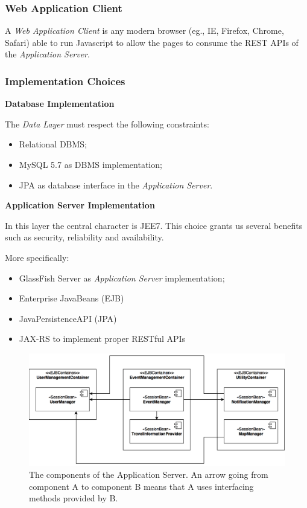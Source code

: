 \documentclass{article}
\begin{document}
	\subsubsection{Web Application Client}
	A \textit{Web Application Client} is any modern browser (eg., IE, Firefox, Chrome, Safari) able to run Javascript to allow the pages to consume the REST APIs of the \textit{Application Server}.


	\subsubsection{Implementation Choices}

	\textbf{Database Implementation}

	\medskip
	\noindent
	The \textit{Data Layer} must respect the following constraints: 
	\begin{itemize}
	\item Relational DBMS;
	\item MySQL 5.7 as DBMS implementation;
	\item JPA as database interface in the \textit{Application Server}.
	\end{itemize}

	\bigskip
	\noindent
	\textbf{Application Server Implementation}

	\medskip
	\noindent
	In this layer the central character is JEE7.
	This choice grants us several benefits such as security, reliability and availability.


	More specifically:

	\begin{itemize}
	\item GlassFish Server as \textit{Application Server} implementation;
	\item Enterprise JavaBeans (EJB)
	\item JavaPersistenceAPI (JPA)
	\item JAX-RS to implement proper RESTful APIs
	\end{itemize}

	\bigskip
	\begin{figure}[!ht]
	\centering
	\includegraphics[width=\textwidth]{img/diagrams/asc.png}
	\caption{The components of the Application Server. An arrow going from component A to component B means that A uses interfacing methods provided by B.}
	\end{figure}
\end{document}

